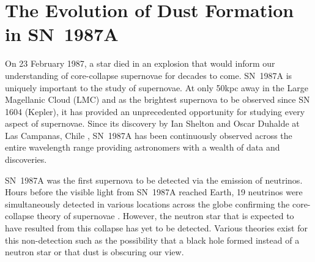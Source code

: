 \chapter{The Evolution of Dust Formation in SN~1987A}\label{chp:chp5}

%




On 23 February 1987, a star died in an explosion that would inform our understanding of core-collapse supernovae for decades to come.  SN~1987A is uniquely important to the study of supernovae.  At only 50kpc away in the Large Magellanic Cloud (LMC) and as the brightest supernova to be observed since SN 1604 (Kepler), it has provided an unprecedented opportunity for studying every aspect of supernovae.  Since its discovery by Ian Shelton and Oscar Duhalde at Las Campanas, Chile \citep{Kunkel1987}, SN~1987A has been continuously observed across the entire wavelength range providing astronomers with a wealth of data and discoveries.  

SN~1987A was the first supernova to be detected via the emission of neutrinos.  Hours before the visible light from SN~1987A reached Earth, 19 neutrinos were simultaneously detected in various locations across the globe confirming the core-collapse theory of supernovae \citep{Bionta1987,Hirata1987}.  However, the neutron star that is expected to have resulted from this collapse has yet to be detected.  Various theories exist for this non-detection such as the possibility that a black hole formed instead of a neutron star or that dust is obscuring our view.

